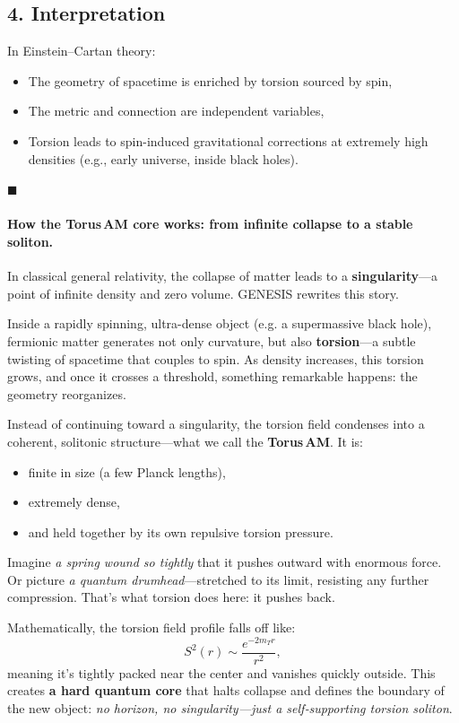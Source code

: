 \documentclass{article}
\begin{document}
\subsection*{4. Interpretation}
In Einstein--Cartan theory:
\begin{itemize}
  \item The geometry of spacetime is enriched by torsion sourced by spin,
  \item The metric and connection are independent variables,
  \item Torsion leads to spin-induced gravitational corrections at extremely high densities (e.g., early universe, inside black holes).
\end{itemize}

\hfill $\blacksquare$




\paragraph{How the Torus\,AM core works: from infinite collapse to a stable soliton.}

In classical general relativity, the collapse of matter leads to a \textbf{singularity}—a point of infinite density and zero volume. \textsc{GENESIS} rewrites this story.

Inside a rapidly spinning, ultra-dense object (e.g. a supermassive black hole), fermionic matter generates not only curvature, but also \textbf{torsion}—a subtle twisting of spacetime that couples to spin. As density increases, this torsion grows, and once it crosses a threshold, something remarkable happens: the geometry reorganizes.

Instead of continuing toward a singularity, the torsion field condenses into a coherent, solitonic structure—what we call the \textbf{Torus\,AM}. It is:
\begin{itemize}
  \item finite in size (a few Planck lengths),
  \item extremely dense,
  \item and held together by its own repulsive torsion pressure.
\end{itemize}

Imagine \textit{a spring wound so tightly} that it pushes outward with enormous force. Or picture \textit{a quantum drumhead}—stretched to its limit, resisting any further compression. That’s what torsion does here: it pushes back.

Mathematically, the torsion field profile falls off like:
\begin{equation}\label{eq:auto250}
S^2(r) \sim \frac{e^{-2m_T r}}{r^2},
\end{equation}
meaning it's tightly packed near the center and vanishes quickly outside. This creates \textbf{a hard quantum core} that halts collapse and defines the boundary of the new object: \textit{no horizon, no singularity—just a self‑supporting torsion soliton}.
\end{document}
